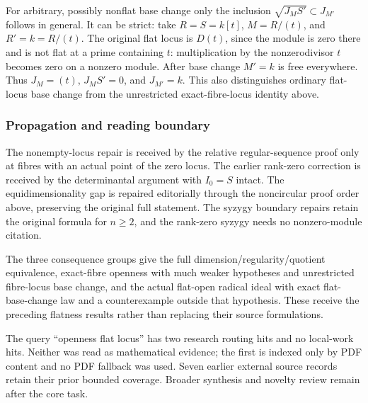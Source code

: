 For arbitrary, possibly nonflat base change only the inclusion \(\sqrt{J_M S'}\subset J_{M'}\) follows in general. It can be strict: take \(R=S=k[t]\), \(M=R/(t)\), and \(R'=k=R/(t)\). The original flat locus is \(D(t)\), since the module is zero there and is not flat at a prime containing \(t\): multiplication by the nonzerodivisor \(t\) becomes zero on a nonzero module. After base change \(M'=k\) is free everywhere. Thus \(J_M=(t)\), \(J_MS'=0\), and \(J_{M'}=k\). This also distinguishes ordinary flat-locus base change from the unrestricted exact-fibre-locus identity above.

\subsubsection{Propagation and reading boundary}\label{propagation-and-reading-boundary}

The nonempty-locus repair is received by the relative regular-sequence proof only at fibres with an actual point of the zero locus. The earlier rank-zero correction is received by the determinantal argument with \(I_0=S\) intact. The equidimensionality gap is repaired editorially through the noncircular proof order above, preserving the original full statement. The syzygy boundary repairs retain the original formula for \(n\geq2\), and the rank-zero syzygy needs no nonzero-module citation.

The three consequence groups give the full dimension/regularity/quotient equivalence, exact-fibre openness with much weaker hypotheses and unrestricted fibre-locus base change, and the actual flat-open radical ideal with exact flat-base-change law and a counterexample outside that hypothesis. These receive the preceding flatness results rather than replacing their source formulations.

The query ``openness flat locus'' has two research routing hits and no local-work hits. Neither was read as mathematical evidence; the first is indexed only by PDF content and no PDF fallback was used. Seven earlier external source records retain their prior bounded coverage. Broader synthesis and novelty review remain after the core task.
